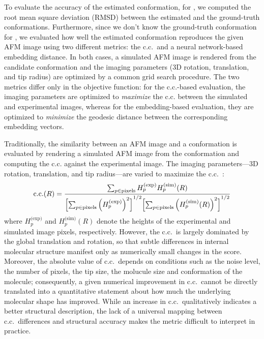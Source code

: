To evaluate the accuracy of the estimated conformation, for \AK, we computed the root mean square deviation (RMSD) between the estimated and the ground-truth conformations. 
Furthermore, since we don't know the ground-truth conformation for \flhac, we evaluated how well the estimated conformation reproduces the given AFM image using two different metrics: 
the c.c.\ and a neural network-based embedding distance.
In both cases, a simulated AFM image is rendered from the candidate conformation and the imaging parameters (3D rotation, translation, and tip radius) are optimized by a common grid search procedure.
The two metrics differ only in the objective function: for the c.c.-based evaluation, the imaging parameters are optimized to \emph{maximize} the c.c. between the simulated and experimental images, 
whereas for the embedding-based evaluation, they are optimized to \emph{minimize} the geodesic distance between the corresponding embedding vectors.

Traditionally, the similarity between an AFM image and a conformation is evaluated by rendering a simulated AFM image from the conformation 
and computing the c.c. against the experimental image. 
The imaging parameters---3D rotation, translation, and tip radius---are varied to maximize the c.c.\ \cite{Niina2020}: 
\begin{equation}
    \mathrm{c.c.}(R)=
    \frac{\sum_{p \in \text{pixels}} H^{\text{(exp)}}_p H^{\text{(sim)}}_p(R)}
         {{\Bigl[ \sum_{p \in \text{pixels}} \left(H^{\text{(exp)}}_p\right)^2 \Bigr]}^{1/2}
          {\Bigl[ \sum_{p \in \text{pixels}} \left(H^{\text{(sim)}}_p(R)\right)^2 \Bigr]}^{1/2}}
    \label{eq:cc}
\end{equation}
where $H^{\text{(exp)}}_p$ and $H^{\text{(sim)}}_p(R)$ denote the heights of the experimental and simulated image pixels, respectively. 
However, the c.c.\ is largely dominated by the global translation and rotation,
so that subtle differences in internal molecular structure manifest only as numerically small changes in the score.
Moreover, the absolute value of c.c.\ depends on conditions such as the noise level, the number of pixels, the tip size, the molucule size and conformation of the molecule;
consequently, a given numerical improvement in c.c.\ cannot be directly translated into a quantitative statement about how much the underlying molecular shape has improved.
While an increase in c.c.\ qualitatively indicates a better structural description, the lack of a universal mapping between c.c.\ differences and structural accuracy makes the metric difficult to interpret in practice.

